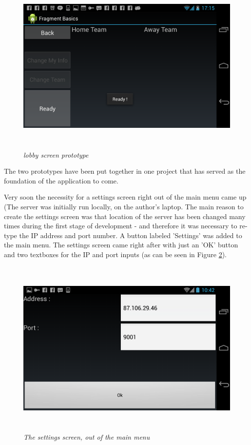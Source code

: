 \begin{figure}
\includegraphics[height=3.5in,width=6.23in]{./images/android_screenshots/menu_prototype/MENU_prototype_2.png}  
\caption{\small \sl lobby screen prototype \label{fig:menuPrototype2}}
\end{figure}

The two prototypes have been put together in one project that has served as the
foundation of the application to come.\newline

Very soon the necessity for a settings screen right out of the main menu came up
(The server was initially run locally, on the author's laptop. The main reason
to create the settings screen was that location of the server has been changed
many times during the first stage of development - and therefore it was
necessary to re-type the IP address and port number. A button labeled 'Settings'
was added to the main menu. The settings screen came right after with just an
'OK' button and two textboxes for the IP and port inputs (as can be seen in
Figure \ref{fig:main_menu_settings}).\newline

\begin{figure}
\includegraphics[height=3.5in,width=6.23in]{./images/android_screenshots/tutorial_main_settings.png}  
\caption{\small \sl The settings screen, out of the main
menu\label{fig:main_menu_settings}}
\end{figure}

